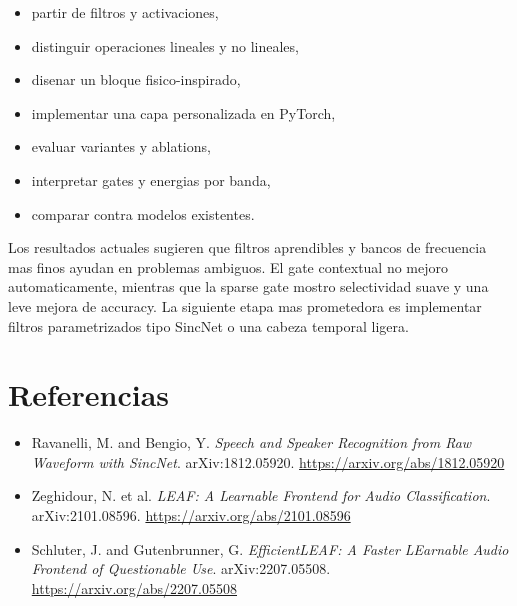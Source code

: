 \documentclass[11pt,letterpaper]{article}
\begin{document}
\begin{itemize}[leftmargin=*]
    \item partir de filtros y activaciones,
    \item distinguir operaciones lineales y no lineales,
    \item disenar un bloque fisico-inspirado,
    \item implementar una capa personalizada en PyTorch,
    \item evaluar variantes y ablations,
    \item interpretar gates y energias por banda,
    \item comparar contra modelos existentes.
\end{itemize}

Los resultados actuales sugieren que filtros aprendibles y bancos de frecuencia
mas finos ayudan en problemas ambiguos. El gate contextual no mejoro
automaticamente, mientras que la sparse gate mostro selectividad suave y una
leve mejora de accuracy. La siguiente etapa mas prometedora es implementar
filtros parametrizados tipo SincNet o una cabeza temporal ligera.

\section*{Referencias}

\begin{itemize}[leftmargin=*]
    \item Ravanelli, M. and Bengio, Y. \textit{Speech and Speaker Recognition
    from Raw Waveform with SincNet}. arXiv:1812.05920.
    \url{https://arxiv.org/abs/1812.05920}
    \item Zeghidour, N. et al. \textit{LEAF: A Learnable Frontend for Audio
    Classification}. arXiv:2101.08596.
    \url{https://arxiv.org/abs/2101.08596}
    \item Schluter, J. and Gutenbrunner, G. \textit{EfficientLEAF: A Faster
    LEarnable Audio Frontend of Questionable Use}. arXiv:2207.05508.
    \url{https://arxiv.org/abs/2207.05508}
\end{itemize}
\end{document}
